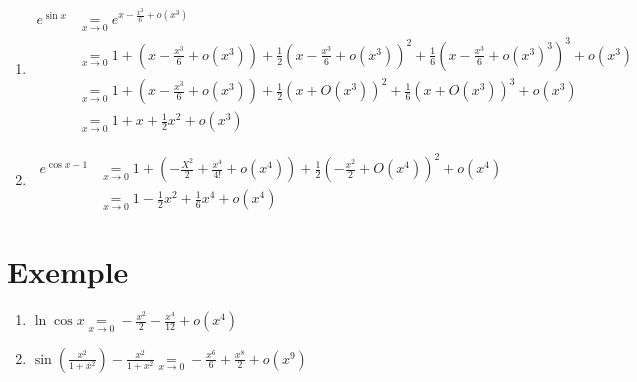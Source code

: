 \documentclass[../main.tex]{subfiles}
\begin{document}
\begin{enumerate}
    \item \begin{align*}
        e^{\sin x} &\underset{x\to 0}{=} e^{x - \frac{x^3}{6} + o(x^3)} \\
        &\underset{x\to 0}{=} 1 + \left( x - \frac{x^3}{6} + o(x^3) \right) + \frac{1}{2} \left( x - \frac{x^3}{6} + o(x^3) \right)^2 + \frac{1}{6} \left( x - \frac{x^3}{6} + o(x^3)^3 \right)^3 + o(x^3) \\
        &\underset{x\to 0}{=} 1 + \left( x - \frac{x^3}{6} + o(x^3) \right) + \frac{1}{2} (x + O(x^3))^2 + \frac{1}{6} (x + O(x^3))^3 + o(x^3) \\
        &\underset{x\to 0}{=} 1 + x + \frac{1}{2} x^2 + o(x^3)
    \end{align*}

    \item \begin{align*}
        e^{\cos x - 1} &\underset{x\to 0}{=} 1 + \left( -\frac{X^2}{2} + \frac{x^4}{4!} + o(x^4) \right) + \frac{1}{2} \left( -\frac{x^2}{2} + O(x^4) \right)^2 + o(x^4) \\
        &\underset{x\to 0}{=} 1 - \frac{1}{2} x^2 + \frac{1}{6} x^4 + o(x^4)
    \end{align*}
\end{enumerate}

\section{Exemple}
\begin{tcolorbox}[title=Exemple 25.61, title filled=false, colframe=darkgreen, colback=darkgreen!10!white]
    \begin{enumerate}
        \item $\ln \cos x \underset{x\to 0}{=} -\frac{x^2}{2} - \frac{x^4}{12} + o(x^4)$
        \setcounter{enumi}{2}
        \item $\sin \left( \frac{x^2}{1 + x^2} \right) - \frac{x^2}{1 + x^2} \underset{x\to 0}{=} -\frac{x^6}{6} + \frac{x^8}{2} + o(x^9)$
    \end{enumerate}
\end{tcolorbox}
\end{document}
